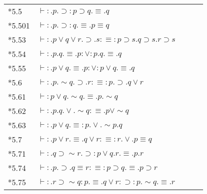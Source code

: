 \begin{tabular}[t]{l@{\quad}l@{\quad}l@{\quad}ll}
{*5.5} & $\vdash:.p.\supset:p\supset{q}.\equiv.q$\\
{*5.501} & $\vdash:.p.\supset:q.\equiv.p\equiv{q}$\\
{*5.53} & $\vdash:.p\vee{q}\vee{r}.\supset.s:\equiv:p\supset{s}.q\supset{s}.r\supset{s}$\\
{*5.54} & $\vdash:.p.q.\equiv.p:\vee:p.q.\equiv.q$\\
{*5.55} & $\vdash:.p\vee{q}.\equiv.p:\vee:p\vee{q}.\equiv.q$\\
{*5.6} & $\vdash:.p.\sim{q}.\supset.r:\equiv:p.\supset.q\vee{r}$\\
{*5.61} & $\vdash:p\vee{q}.\sim{q}.\equiv.p.\sim{q}$\\
{*5.62} & $\vdash:.p.q.\vee.\sim{q}:\equiv.p\vee\sim{q}$\\
{*5.63} & $\vdash:.p\vee{q}.\equiv:p.\vee.\sim{p}.q$\\
{*5.7} & $\vdash:.p\vee{r}.\equiv.q\vee{r}:\equiv:r.\vee.p\equiv{q}$\\
{*5.71} & $\vdash:.q\supset\sim{r}.\supset:p\vee{q}.r.\equiv.p.r$\\
{*5.74} & $\vdash:.p.\supset.q\equiv{r}:\equiv:p\supset{q}.\equiv.p\supset{r}$\\
{*5.75} & $\vdash:.r\supset\sim{q}:p.\equiv.q\vee{r}:\supset:p.\sim{q}.\equiv.r$\\
\end{tabular}